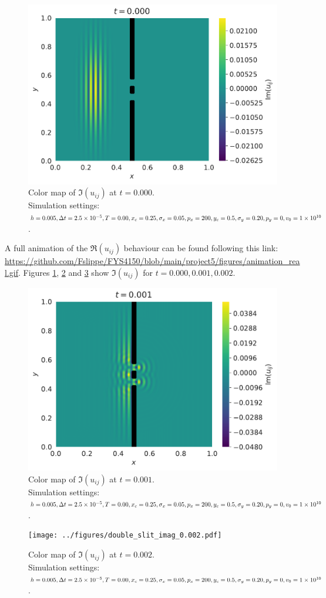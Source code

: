 \documentclass[english,notitlepage,reprint,nofootinbib]{revtex4-1}  %
\begin{document}
\begin{figure}[H]
    \centering
    \includegraphics[width=.5\textwidth]{../figures/double_slit_imag_0.000.pdf}
    \caption{Color map of $\Im (u_{ij})$ at $t = 0.000$. \\Simulation settings: $h = 0.005, \Delta t = 2.5 \times 10^{-5}, \\T = 0.00, x_c = 0.25, \sigma_x = 0.05, p_x = 200, y_c = 0.5, \\\sigma_y = 0.20, p_y = 0, v_0 = 1 \times 10^{10}$.}
    \label{fig:double_slit_imag_0.000}
\end{figure}
A full animation of the $\Re(u_{ij})$ behaviour can be found following this link: \url{https://github.com/Fslippe/FYS4150/blob/main/project5/figures/animation_real.gif}.
Figures \ref{fig:double_slit_imag_0.000}, \ref{fig:double_slit_imag_0.001} and \ref{fig:double_slit_imag_0.002} show $\Im(u_{ij})$ for $t=0.000, 0.001, 0.002$.
\begin{figure}[H]
    \centering
    \includegraphics[width=.5\textwidth]{../figures/double_slit_imag_0.001.pdf}
    \caption{Color map of $\Im (u_{ij})$ at $t = 0.001$. \\Simulation settings: $h = 0.005, \Delta t = 2.5 \times 10^{-5}, \\T = 0.00, x_c = 0.25, \sigma_x = 0.05, p_x = 200, y_c = 0.5, \\\sigma_y = 0.20, p_y = 0, v_0 = 1 \times 10^{10}$.}
    \label{fig:double_slit_imag_0.001}
\end{figure}
\begin{figure}[H]
    \centering
    \texttt{[image: ../figures/double\_slit\_imag\_0.002.pdf]}
    \caption{Color map of $\Im (u_{ij})$ at $t = 0.002$. \\Simulation settings: $h = 0.005, \Delta t = 2.5 \times 10^{-5}, \\T = 0.00, x_c = 0.25, \sigma_x = 0.05, p_x = 200, y_c = 0.5, \\\sigma_y = 0.20, p_y = 0, v_0 = 1 \times 10^{10}$.}
    \label{fig:double_slit_imag_0.002}
\end{figure}
\end{document}
